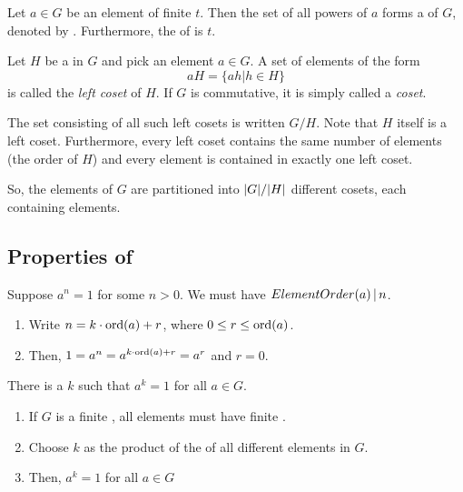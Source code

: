 \begin{lemma}
  Let $a \in G$ be an element of finite  $t$.
  Then the set of all powers of $a$ forms a   of $G$, denoted by .
  Furthermore, the  of  is $t$.
\end{lemma}

\begin{definition}\label{def:Left_Coset}
  Let $H$ be a  in $G$ and pick an element $a \in G$.
  A set of elements of the form
  \begin{equation}\label{eq:Left_Coset}
    aH = \lbrace ah \vert h \in H \rbrace
  \end{equation}
  is called the \emph{left coset} of $H$.
  If $G$ is commutative, it is simply called a \emph{coset}.

  The set consisting of all such left cosets is written $G/H$.
  Note that $H$ itself is a left coset.
  Furthermore, every left coset contains the same number of elements (the order of $H$) and every element is contained in exactly one left coset.

  So, the elements of $G$ are partitioned into $\lvert G \rvert / \lvert H \rvert$ different cosets, each containing  elements.
\end{definition}

\subsection{Properties of }\label{subsec:Properties_of_Groups}
\begin{propertylist}
\item Suppose $a^{n} = 1$ for some $n > 0$. We must have $ElementOrder(a) \operatorname{\vert} n$.
  \begin{enumerate}[noitemsep]
  \item Write $n = k \cdot \operatorname{\text{ord}}(a) + r$, where $0 \leq r \leq \operatorname{\text{ord}}(a)$.
  \item Then, $1 = a^{n} = a^{k \cdot \operatorname{\text{ord}}(a) + r} = a^{r}$ and $r = 0$.
  \end{enumerate}
\item There is a $k$ such that $a^{k} = 1$ for all $a \in G$.
  \begin{enumerate}[noitemsep]
  \item If $G$ is a finite , all elements must have finite .
  \item Choose $k$ as the product of the  of all different elements in $G$.
  \item Then, $a^{k} = 1$ for all $a \in G$
  \end{enumerate}
\end{propertylist}

